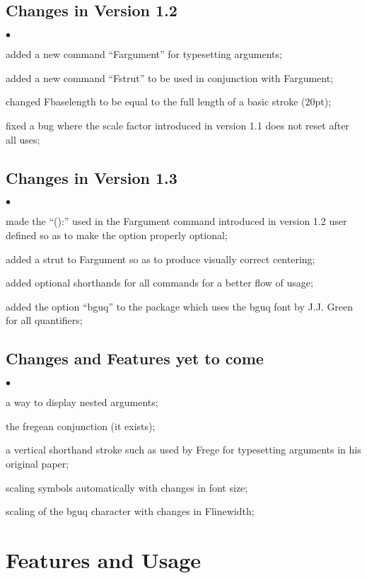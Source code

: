 \documentclass[12pt]{article}
\newcommand{\squishlist}{
  \begin{list}{$\bullet$}{
    \setlength{\itemsep}{0pt}
    \setlength{\parsep}{0pt}
    \setlength{\topsep}{0pt}
    \setlength{\partopsep}{0pt}
    \setlength{\leftmargin}{1em}
    \setlength{\labelwidth}{1em}
    \setlength{\parskip}{0pt}
    \setlength{\partopsep}{0pt}
    \setlength{\rightmargin}{0pt}
    \setlength{\labelsep}{0.5em}}}
\newcommand{\squishlistend}{\end{list}}
\begin{document}
\subsection{Changes in Version 1.2}
  \squishlist
    \item added a new command ``Fargument'' for typesetting arguments;
    \item added a new command ``Fstrut'' to be used in conjunction with Fargument;
    \item changed Fbaselength to be equal to the full length of a basic stroke (20pt);
    \item fixed a bug where the scale factor introduced in version 1.1 does not reset 
      after all uses;
  \squishlistend

\subsection{Changes in Version 1.3}
  \squishlist
    \item made the ``():'' used in the Fargument command introduced in version 1.2 
      user defined so as to make the option properly optional;
    \item added a strut to Fargument so as to produce visually correct centering;
    \item added optional shorthands for all commands for a better flow of usage;
    \item added the option ``bguq'' to the package which uses the bguq font by J.J. 
      Green for all quantifiers;
  \squishlistend

\subsection{Changes and Features yet to come}
  \squishlist
    \item a way to display nested arguments;
    \item the fregean conjunction (it exists);
    \item a vertical shorthand stroke such as used by Frege for typesetting arguments 
      in his original paper;
    \item scaling symbols automatically with changes in font size;
    \item scaling of the bguq character with changes in Flinewidth;
  \squishlistend

\section{Features and Usage}
\end{document}
